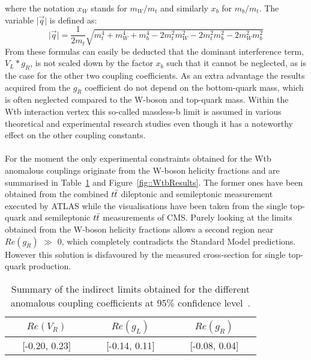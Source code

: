 where the notation $x_W$ stands for $m_W/m_t$ and similarly $x_b$ for $m_b/m_t$.
The variable $\vert \vec{q} \vert$ is defined as:
\begin{equation}
 \vert \vec{q} \vert = \frac{1}{2 m_{t}} \sqrt{m_{t}^{4} + m_{W}^{4} + m_{b}^{4} - 2m_{t}^{2} m_{W}^{2} - 2m_{t}^{2} m_{b}^{2} - 2m_{W}^{2}m_{b}^{2}}
\end{equation}
From these formulas can easily be deducted that the dominant interference term, $V_L * g_R$, is not scaled down by the factor $x_b$ such that it cannot be neglected, as is the case for the other two coupling coefficients. As an extra advantage the results acquired from the $g_R$ coefficient do not depend on the bottom-quark mass, which is often neglected compared to the W-boson and top-quark mass. Within the Wtb interaction vertex this so-called massless-b limit is assumed in various theoretical and experimental research studies even though it has a noteworthy effect on the other coupling constants.
\\
\\
For the moment the only experimental constraints obtained for the Wtb anomalous couplings originate from the W-boson helicity fractions and are summarised in Table~\ref{table::AnomCoupResults} and Figure~\ref{fig::WtbResults}.
The former ones have been obtained from the combined $t\bar{t}$ dileptonic and semileptonic measurement executed by ATLAS while the visualisations have been taken from the single top-quark and semileptonic $t\bar{t}$ measurements of CMS. Purely looking at the limits obtained from the W-boson helicity fractions allows a second region near $Re(g_R)$ $\gg$ $0$, which completely contradicts the Standard Model predictions. However this solution is disfavoured by the measured cross-section for single top-quark production. %
\\

\begin{table}[h!t]
 \caption{Summary of the indirect limits obtained for the different anomalous coupling coefficients at 95$\%$ confidence level~\cite{AtlasWtbLimits}.} \label{table::AnomCoupResults}
 \centering
 \begin{tabular}{c|c|c}
  $Re(V_R)$ 		& $Re(g_L)$ 		& $Re(g_R)$ 		\\
  \hline
  ~~ [-0.20, 0.23] ~~	& ~~ [-0.14, 0.11] ~~	& ~~ [-0.08, 0.04] ~~	\\
 \end{tabular}
\end{table}

